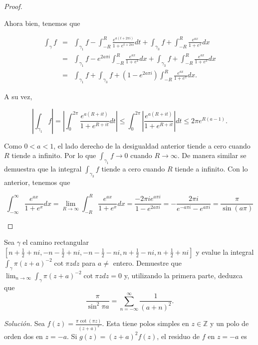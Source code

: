 \documentclass[12pt]{article}
\newcommand{\Z}{\mathbb{Z}}
\newenvironment{problem}[2][Problema]{\begin{trivlist}
\item[\hskip \labelsep {\bfseries #1}\hskip \labelsep {\bfseries #2.}]}{\end{trivlist}}
\begin{document}
\begin{proof}
\begin{itemize}
Ahora bien, tenemos que 

\begin{eqnarray*}
\int_{\gamma}f &=& \int_{\gamma_1} f - \int_{-R}^R \frac{e^{a(t + 2 \pi i)}}{1+e^{t + 2\pi i }}dt + \int_{\gamma_3} f + \int_{-R}^R \frac{e^{ax}}{1+ e^x} dx\\
&=& \int_{\gamma_1} f - e^{2a\pi i} \int_{-R}^R \frac{e^{a x}}{1+e^{x }}dx + \int_{\gamma_3} f + \int_{-R}^R \frac{e^{ax}}{1+ e^x}dx\\
&=& \int_{\gamma_1} f + \int_{\gamma_3} f + (1 - e^{2a\pi i})\int_{-R}^R \frac{e^{a x}}{1+e^{x }}dx.
\end{eqnarray*}

A su vez,

$$ \left\lvert \int_{\gamma_1} f \right\rvert = \left\lvert \int_{0}^{2 \pi}\frac{e^{a(R + it)}}{1+e^{R+it}}dt \right\rvert 
\leq \int_0^{2\pi}\left\lvert \frac{e^{a(R + it)}}{1+e^{R+it}}\right\rvert dt \leq 2\pi  e^{R(a-1)}.$$

Como $0 < a < 1$, el lado derecho de la desigualdad anterior tiende a cero cuando $R$ tiende a infinito. Por lo que  $\int_{\gamma_1} f \to 0$ cuando $R \to \infty.$ De manera similar se demuestra que la integral $\int_{\gamma_3} f$ tiende a cero cuando $R$ tiende a infinito. Con lo anterior, tenemos que

$$\int_{-\infty}^\infty \frac{e^{ax}}{1+e^x}dx = \lim_{R \to \infty} \int_{-R}^R  \frac{e^{ax}}{1+e^x}dx = \frac{-2 \pi i e^{a \pi i}}{1-e^{2 a \pi i}} = - \frac{2 \pi i}{e^{-a \pi i} - e^{a \pi i}} = \frac{\pi}{\sin(a \pi )}$$
\end{itemize}
\end{proof}



\begin{problem}{6} 
Sea $\gamma$ el camino rectangular $[n+\frac{1}{2} + ni, -n -\frac{1}{2} + ni, -n - \frac{1}{2} -ni, n+\frac{1}{2}-ni, n + \frac{1}{2}+ni]$ y evalue la integral $\int_\gamma \pi(z + a )^{-2} \cot \pi z dz$ para $a \neq$ entero. Demuestre que $\lim_{n \to \infty} \int_\gamma \pi(z+a)^{-2} \cot \pi z dz = 0$ y, utilizando la primera parte, deduzca que 
$$\frac{\pi}{\sin^2 \pi a} = \sum_{n=-\infty}^\infty \frac{1}{(a+n)^2}.$$
\end{problem}
\textit{Solución.} Sea $f(z) = \frac{\pi \cot(\pi z)}{(z+a)^2}$. Esta tiene polos simples en $z \in \Z$ y un polo de orden dos en $z=-a.$ Si $g(z) = (z+a)^2 f(z)$, el residuo de $f$ en $z=-a$ es
\end{document}
